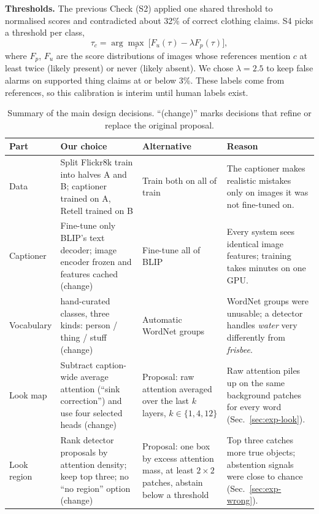 \documentclass[conference]{IEEEtran}
\begin{document}
\textbf{Thresholds.} The previous Check (S2) applied one shared threshold to normalised scores and contradicted
about 32\% of correct clothing claims. S4 picks a threshold per class,
\begin{equation}
\tau_c = \arg\max_{\tau}\ \bigl[F_u(\tau) - \lambda F_p(\tau)\bigr],
\label{eq:tau}
\end{equation}
where $F_p$, $F_u$ are the score distributions of images whose references mention $c$ at least twice (likely
present) or never (likely absent). We chose $\lambda=2.5$ to keep false alarms on supported thing claims at
or below 3\%. These labels come from references, so this calibration is interim until human labels exist.

\begin{table}[t]
\caption{Summary of the main design decisions. ``(change)'' marks decisions that refine or replace the
original proposal.}
\label{tab:design}
\centering\footnotesize
\begin{tabular}{@{}>{\raggedright\arraybackslash}p{1.5cm}>{\raggedright\arraybackslash}p{5.0cm}>{\raggedright\arraybackslash}p{3.9cm}>{\raggedright\arraybackslash}p{6.2cm}@{}}
\toprule
Part & Our choice & Alternative & Reason \\
\midrule
Data & Split Flickr8k train into halves A and B; captioner trained on A, Retell trained on B & Train both on
all of train & The captioner makes realistic mistakes only on images it was not fine-tuned on. \\
Captioner & Fine-tune only BLIP's text decoder; image encoder frozen and features cached (change) & Fine-tune
all of BLIP & Every system sees identical image features; training takes minutes on one GPU. \\
Vocabulary & 169 hand-curated classes, three kinds: person / thing / stuff (change) & Automatic WordNet
groups & WordNet groups were unusable; a detector handles \emph{water} very differently from
\emph{frisbee}. \\
Look map & Subtract caption-wide average attention (``sink correction'') and use four selected heads
(change) & Proposal: raw attention averaged over the last $k$ layers, $k\in\{1,4,12\}$ & Raw attention piles
up on the same background patches for every word (Sec.~\ref{sec:exp-look}). \\
Look region & Rank detector proposals by attention density; keep top three; no ``no region'' option
(change) & Proposal: one box by excess attention mass, at least $2\times2$ patches, abstain below a threshold
& Top three catches more true objects; abstention signals were close to chance (Sec.~\ref{sec:exp-wrong}). \\

\end{tabular}
\end{table}
\end{document}
